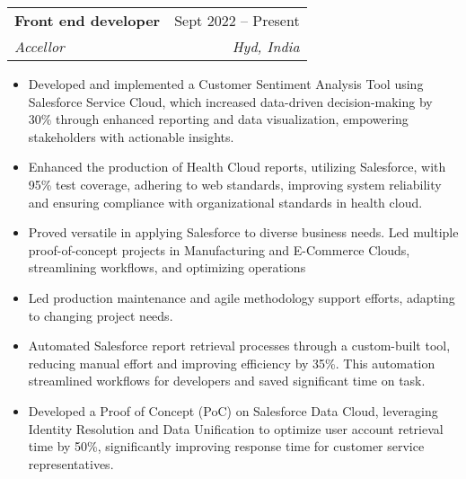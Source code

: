 \documentclass[letterpaper,11pt]{article}
\makeatletter
\newcommand{\resumeItem}[1]{
  \item\small{
    {#1 \vspace{-2pt}}
  }
}
\newcommand{\resumeSubheading}[4]{
  \vspace{-2pt}\item
    \begin{tabular*}{0.97\textwidth}[t]{l@{\extracolsep{\fill}}r}
      \textbf{#1} & #2 \\
      \textit{\small#3} & \textit{\small #4} \\
    \end{tabular*}\vspace{-7pt}
}
\newcommand{\resumeSubSubheading}[2]{
    \item
    \begin{tabular*}{0.97\textwidth}{l@{\extracolsep{\fill}}r}
      \textit{\small#1} & \textit{\small #2} \\
    \end{tabular*}\vspace{-7pt}
}
\newcommand{\resumeSubHeadingListEnd}{\end{itemize}}
\newcommand{\resumeItemListStart}{\begin{itemize}}
\newcommand{\resumeItemListEnd}{\end{itemize}\vspace{-5pt}}
\makeatother
\begin{document}
    \resumeSubheading
      {Front end developer}{Sept 2022 -- Present}
      {Accellor}{Hyd, India}
      \resumeItemListStart
        \resumeItem{Developed and implemented a Customer Sentiment Analysis Tool using Salesforce Service Cloud, which increased data-driven decision-making by 30\% through enhanced reporting and data visualization, empowering stakeholders with actionable insights.}
        \resumeItem{Enhanced the production of Health Cloud reports, utilizing Salesforce, with 95\% test coverage, adhering to web standards, improving system reliability and ensuring compliance with organizational standards in health cloud.}
        \resumeItem{Proved versatile in applying Salesforce to diverse business needs. Led multiple proof-of-concept projects in Manufacturing and E-Commerce Clouds, streamlining workflows, and optimizing operations}
        \resumeItem{Led production maintenance and agile methodology support efforts, adapting to changing project needs.}
        \resumeItem{Automated Salesforce report retrieval processes through a custom-built tool, reducing manual effort and improving efficiency by 35\%. This automation streamlined workflows for developers and saved significant time on task.}
        \resumeItem{Developed a Proof of Concept (PoC) on Salesforce Data Cloud, leveraging Identity Resolution and Data Unification to optimize user account retrieval time by 50\%, significantly improving response time for customer service representatives.}
      \resumeItemListEnd
      


\end{document}
